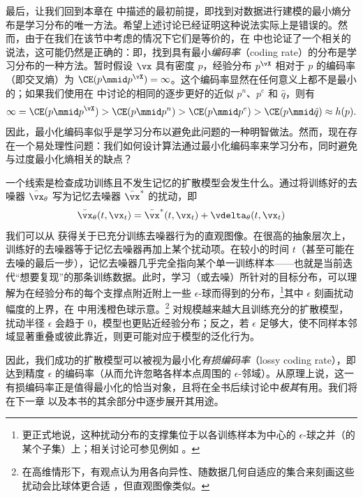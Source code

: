 \documentclass[../../book-main_zh.tex]{subfiles}
\begin{document}
最后，让我们回到本章在  中描述的最初前提，即找到对数据进行建模的最小熵分布是学习分布的唯一方法。希望上述讨论已经证明这种说法实际上是错误的。然而，由于在我们在该节中考虑的情况下它们是等价的，在  中也论证了一个相关的说法，这可能仍然是正确的：即，找到具有最小\textit{编码率}（coding rate）的分布是学习分布的一种方法。暂时假设 \(\vx\) 具有密度 \(p\)，经验分布 \(p^{\vX}\) 相对于 \(p\) 的编码率（即交叉熵）为 \(\CE(p \mmid p^{\vX}) = \infty\)。这个编码率显然在任何意义上都不是最小的；如果我们使用在  中讨论的相同的逐步更好的近似 \(p^{n}\)、\(p^{e}\) 和 \(\hat{q}\)，则有
\begin{equation}
    \infty = \CE(p \mmid p^{\vX}) > \CE(p \mmid p^{n}) > \CE(p \mmid
    p^{e}) > \CE(p \mmid \hat{q}) \approx h(p).
\end{equation}
因此，最小化编码率似乎是学习分布以避免此问题的一种明智做法。然而，现在存在一个易处理性问题：我们如何设计算法通过最小化编码率来学习分布，同时避免与过度最小化熵相关的缺点？

一个线索是检查成功训练且不发生记忆的扩散模型会发生什么。通过将训练好的去噪器 \(\bar{\vx}_{\theta}\) 写为记忆去噪器 \(\bar{\vx}^{\ast}\) 的扰动，即
\begin{equation}
    \bar{\vx}_{\theta}(t, \vx_{t}) = \bar{\vx}^{\ast}(t, \vx_{t}) +
    \vdelta_{\theta}(t, \vx_{t})
\end{equation}
我们可以从  获得关于已充分训练去噪器行为的直观图像。在很高的抽象层次上，训练好的去噪器等于记忆去噪器再加上某个扰动项。在较小的时间 \(t\)（甚至可能在去噪的最后一步），记忆去噪器几乎完全指向某个单一训练样本——也就是当前迭代“想要复现”的那条训练数据。此时，学习（或去噪）所针对的目标分布，可以理解为在经验分布的每个支撑点附近附上一些 \(\epsilon\)-球而得到的分布，\footnote{更正式地说，这种扰动分布的支撑集位于以各训练样本为中心的 \(\epsilon\)-球之并（的某个子集）上；相关讨论可参见例如 \cite{song2025selective}。}其中 \(\epsilon\) 刻画扰动幅度的上界，在  中用浅橙色球示意。\footnote{在高维情形下，有观点认为用各向异性、随数据几何自适应的集合来刻画这些扰动会比球体更合适 \cite{farghly2025diffusion}，但直观图像类似。} 对规模越来越大且训练充分的扩散模型，扰动半径 \(\epsilon\) 会趋于 \(0\)，模型也更贴近经验分布；反之，若 \(\epsilon\) 足够大，使不同样本邻域显著重叠或彼此靠近，则更可能对应于模型的泛化行为。

因此，我们成功的扩散模型可以被视为最小化\textit{有损编码率}（lossy coding rate），即达到精度 \(\epsilon\) 的编码率（从而允许忽略各样本点周围的 \(\epsilon\)-邻域）。从原理上说，这一有损编码率正是值得最小化的恰当对象，且将在全书后续讨论中\textit{极其}有用。我们将在下一章  以及本书的其余部分中逐步展开其用途。
\end{document}
